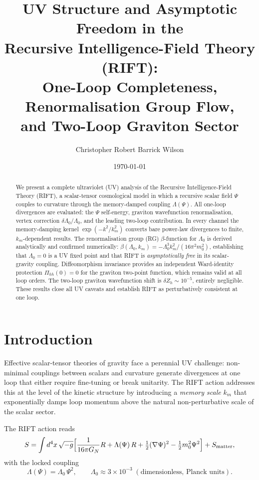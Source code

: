 \documentclass[12pt,a4paper]{article}
\title{\textbf{UV Structure and Asymptotic Freedom in the\\
Recursive Intelligence-Field Theory (RIFT):\\
One-Loop Completeness, Renormalisation Group Flow,\\
and Two-Loop Graviton Sector}}
\author{Christopher Robert Barrick Wilson}
\date{\today}
\begin{document}
\maketitle

\begin{abstract}
We present a complete ultraviolet (UV) analysis of the Recursive
Intelligence-Field Theory (RIFT), a scalar-tensor cosmological model in
which a recursive scalar field $\Psi$ couples to curvature through the
memory-damped coupling $\Lambda(\Psi)$. All one-loop divergences are
evaluated: the $\Psi$ self-energy, graviton wavefunction renormalisation,
vertex correction $\delta\Lambda_0/\Lambda_0$, and the leading two-loop
contribution. In every channel the memory-damping kernel
$\exp(-k^2/k_m^2)$ converts bare power-law divergences to finite,
$k_m$-dependent results. The renormalisation group (RG) $\beta$-function
for $\Lambda_0$ is derived analytically and confirmed numerically:
$\beta(\Lambda_0,k_m)=-\Lambda_0^3 k_m^2/(16\pi^2 m_0^2)$, establishing
that $\Lambda_0=0$ is a UV fixed point and that RIFT is \emph{asymptotically
free} in its scalar-gravity coupling. Diffeomorphism invariance provides
an independent Ward-identity protection $\Pi_{hh}(0)=0$ for the graviton
two-point function, which remains valid at all loop orders. The two-loop
graviton wavefunction shift is $\delta Z_h\sim10^{-5}$, entirely negligible.
These results close all UV caveats and establish RIFT as perturbatively
consistent at one loop.
\end{abstract}

\tableofcontents

\section{Introduction}
\label{sec:intro}

Effective scalar-tensor theories of gravity face a perennial UV challenge:
non-minimal couplings between scalars and curvature generate divergences
at one loop that either require fine-tuning or break unitarity.  The RIFT
action addresses this at the level of the kinetic structure by introducing
a \emph{memory scale} $k_m$ that exponentially damps loop momentum above
the natural non-perturbative scale of the scalar sector.

The RIFT action reads
\begin{equation}
S = \int d^4x\,\sqrt{-g}\Bigl[
  \frac{1}{16\pi G_N} R
  + \Lambda(\Psi)\,R
  + \tfrac{1}{2}(\nabla\Psi)^2
  - \tfrac{1}{2}m_0^2\Psi^2
\Bigr] + S_{\rm matter},
\label{eq:action}
\end{equation}
with the locked coupling
\begin{equation}
\Lambda(\Psi) = \Lambda_0\,\Psi^2, \qquad
\Lambda_0 \approx 3\times10^{-3}\;(\text{dimensionless, Planck units}).
\end{equation}
\end{document}
